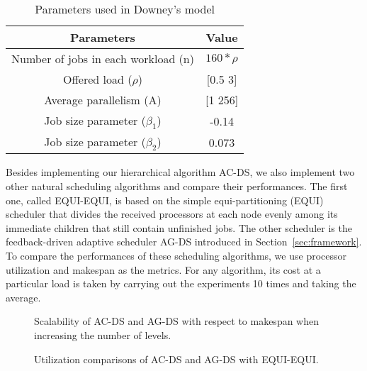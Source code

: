 \documentclass[10pt, a4paper]{article}
\newcommand{\secref}[1]         {Section~\ref{sec:#1}}
\begin{document}
\begin{table}[h]
\caption{Parameters used in Downey's model}
\begin{center}
\begin{tabular}{|c|c|}
  \hline
  Parameters & Value  \\
  \hline \hline
  Number of jobs in each workload (n) & $160*\rho$ \\
Offered load ($\rho$) & [0.5 3] \\
Average parallelism (A) & [1 256] \\
Job size parameter ($\beta_1$) & -0.14 \\
Job size parameter ($\beta_2$) & 0.073 \\
  \hline
\end{tabular}
\end{center}
\label{table:TB1}
\end{table}

Besides implementing our hierarchical algorithm AC-DS, we also implement two other natural
scheduling algorithms and compare their performances. The first one, called EQUI-EQUI, is based on
the simple equi-partitioning (EQUI) scheduler \cite{Edmonds99,EdmondsChBr03} that divides the
received processors at each node evenly among its immediate children that still contain unfinished
jobs. The other scheduler is the feedback-driven adaptive scheduler AG-DS introduced in
\secref{framework}. To compare the performances of these scheduling algorithms, we use processor
utilization and makespan as the metrics. For any algorithm, its cost at a particular load is taken
by carrying out the experiments 10 times and taking the average.

\begin{figure}[t]
\centering
    \caption{Scalability of AC-DS and AG-DS with respect to makespan when increasing the number of levels.}
    \label{fig:Scalability}
\end{figure}
\begin{figure}[t]
\centering

    \caption{Utilization comparisons of AC-DS and AG-DS with EQUI-EQUI.}
    \label{fig:Utilization}
\end{figure}
\end{document}
